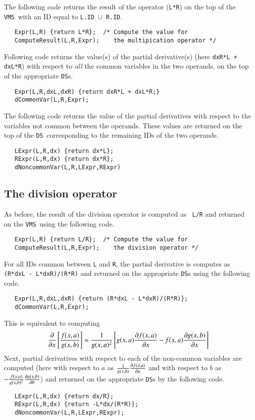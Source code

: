 \documentclass[11pt]{article}
\newcommand{\DS}{{\tt DS}}
\newcommand{\VMS}{{\tt VMS}}
\begin{document}
The following code returns the result of the operator ({\tt L*R}) on
the top of the \VMS\ with an ID equal to {\tt L.ID $\cup$ R.ID}.
\begin{verbatim}
   Expr(L,R) {return L*R};  /* Compute the value for 
   ComputeResult(L,R,Expr);    the multipication operator */
\end{verbatim}
Following code returns the value(s) of the partial derivative(s) (here
{\tt dxR*L + dxL*R}) with respect to {\it all} the common variables in
the two operands, on the top of the appropriate \DS s.  
\begin{verbatim}
   Expr(L,R,dxL,dxR) {return dxR*L + dxL*R;}
   dCommonVar(L,R,Expr);
\end{verbatim}
The following code returns the value of the partial derivatives with
respect to the variables not common between the operands.  These
values are returned on the top of the \DS\ corresponding to the remaining
IDs of the two operands.
\begin{verbatim}
   LExpr(L,R,dx) {return dx*L};
   RExpr(L,R,dx) {return dx*R};
   dNoncommonVar(L,R,LExpr,RExpr)
\end{verbatim}
%
%
\subsection{The division operator}

As before, the result of the division operator is computed as {\tt
L/R} and returned on the \VMS\ using the following code.
\begin{verbatim}
   Expr(L,R) {return L/R};  /* Compute the value for 
   ComputeResult(L,R,Expr);    the division operator */
\end{verbatim}
For all IDs common between {\tt L} and {\tt R}, the partial derivative
is computes as {\tt (R*dxL - L*dxR)/(R*R)} and returned on the
appropriate \DS s using the following code.  
\begin{verbatim}
   Expr(L,R,dxL,dxR) {return (R*dxL - L*dxR)/(R*R)};
   dCommonVar(L,R,Expr);
\end{verbatim}
This is equivalent to computing
\begin{equation}
{\partial \over {\partial x}}\left[{f(x,a) \over g(x,b)}\right] =
{1 \over g(x,a)^2}\left[{g(x,a) {{\partial f(x,a)} \over  {\partial
x}}} - f(x,a) {{\partial g(x,b)} \over {\partial x}}\right] 
\end{equation}
Next, partial derivatives with respect to each of the non-common
variables are computed (here with respect to $a$ as ${1 \over g(x,b)}
{\partial f(x,a) \over \partial a}$ and with respect to $b$ as
$-{f(x,a) \over {g(x,b)^2}}{\partial g(x,b) \over \partial b}$) and
returned on the appropriate \DS s by the following code.
\begin{verbatim}
   LExpr(L,R,dx) {return dx/R};
   RExpr(L,R,dx) {return -L*dx/(R*R)};
   dNoncommonVar(L,R,LExpr,RExpr);
\end{verbatim}
%
%
\end{document}
